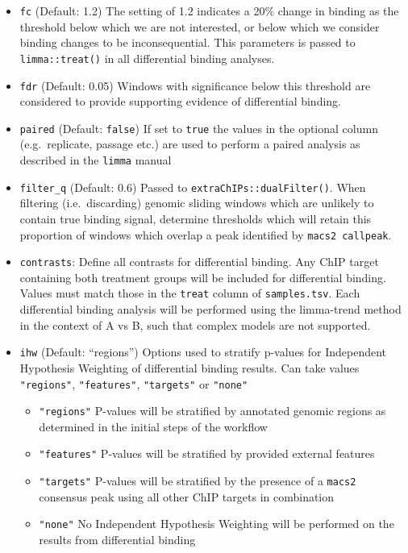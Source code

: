 \documentclass[
]{book}
\providecommand{\tightlist}{%
  \setlength{\itemsep}{0pt}\setlength{\parskip}{0pt}}
\begin{document}
\begin{itemize}
\tightlist
\item
  \texttt{fc} (Default: 1.2) The setting of 1.2 indicates a 20\% change in binding as the threshold below which we are not interested, or below which we consider binding changes to be inconsequential. This parameters is passed to \texttt{limma::treat()} \citep{treat} in all differential binding analyses.
\item
  \texttt{fdr} (Default: 0.05) Windows with significance below this threshold are considered to provide supporting evidence of differential binding.
\item
  \texttt{paired} (Default: \texttt{false}) If set to \texttt{true} the values in the optional column (e.g.~replicate, passage etc.) are used to perform a paired analysis as described in the \texttt{limma} manual
\item
  \texttt{filter\_q} (Default: 0.6) Passed to \texttt{extraChIPs::dualFilter()}. When filtering (i.e.~discarding) genomic sliding windows which are unlikely to contain true binding signal, determine thresholds which will retain this proportion of windows which overlap a peak identified by \texttt{macs2\ callpeak}.
\item
  \texttt{contrasts}: Define all contrasts for differential binding. Any ChIP target containing both treatment groups will be included for differential binding. Values must match those in the \texttt{treat} column of \texttt{samples.tsv}. Each differential binding analysis will be performed using the limma-trend method in the context of A vs B, such that complex models are not supported.
\item
  \texttt{ihw} (Default: ``regions'') Options used to stratify p-values for Independent Hypothesis Weighting\citep{ihw} of differential binding results. Can take values \texttt{"regions"}, \texttt{"features"}, \texttt{"targets"} or \texttt{"none"}

  \begin{itemize}
  \tightlist
  \item
    \texttt{"regions"} P-values will be stratified by annotated genomic regions as determined in the initial steps of the workflow
  \item
    \texttt{"features"} P-values will be stratified by provided external features
  \item
    \texttt{"targets"} P-values will be stratified by the presence of a \texttt{macs2} consensus peak using all other ChIP targets in combination
  \item
    \texttt{"none"} No Independent Hypothesis Weighting will be performed on the results from differential binding
  \end{itemize}
\end{itemize}
\end{document}
